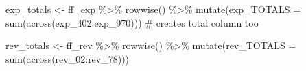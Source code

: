 \documentclass[
  letterpaper,
  DIV=11,
  numbers=noendperiod]{scrreport}
\newenvironment{Shaded}{\begin{snugshade}}{\end{snugshade}}
\newcommand{\AttributeTok}[1]{\textcolor[rgb]{0.40,0.45,0.13}{#1}}
\newcommand{\CommentTok}[1]{\textcolor[rgb]{0.37,0.37,0.37}{#1}}
\newcommand{\FunctionTok}[1]{\textcolor[rgb]{0.28,0.35,0.67}{#1}}
\newcommand{\NormalTok}[1]{\textcolor[rgb]{0.00,0.23,0.31}{#1}}
\newcommand{\OtherTok}[1]{\textcolor[rgb]{0.00,0.23,0.31}{#1}}
\newcommand{\SpecialCharTok}[1]{\textcolor[rgb]{0.37,0.37,0.37}{#1}}
\begin{document}
\begin{Shaded}
\begin{Highlighting}[]
\NormalTok{exp\_totals }\OtherTok{\textless{}{-}}\NormalTok{ ff\_exp }\SpecialCharTok{\%\textgreater{}\%} \FunctionTok{rowwise}\NormalTok{() }\SpecialCharTok{\%\textgreater{}\%} \FunctionTok{mutate}\NormalTok{(}\AttributeTok{exp\_TOTALS =} \FunctionTok{sum}\NormalTok{(}\FunctionTok{across}\NormalTok{(exp\_402}\SpecialCharTok{:}\NormalTok{exp\_970))) }\CommentTok{\# creates total column too}

\NormalTok{rev\_totals }\OtherTok{\textless{}{-}}\NormalTok{ ff\_rev }\SpecialCharTok{\%\textgreater{}\%} \FunctionTok{rowwise}\NormalTok{() }\SpecialCharTok{\%\textgreater{}\%}  \FunctionTok{mutate}\NormalTok{(}\AttributeTok{rev\_TOTALS =} \FunctionTok{sum}\NormalTok{(}\FunctionTok{across}\NormalTok{(rev\_02}\SpecialCharTok{:}\NormalTok{rev\_78)))}


\end{Highlighting}
\end{Shaded}
\end{document}
